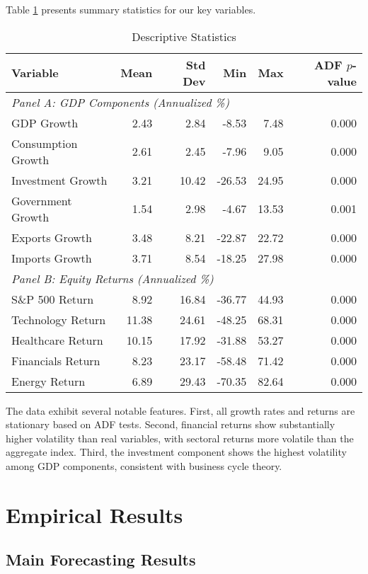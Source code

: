 \documentclass[11pt,letterpaper]{article}
\theoremstyle{plain}
\theoremstyle{definition}
\theoremstyle{remark}
\begin{document}
Table \ref{tab:descriptive} presents summary statistics for our key variables.

\begin{table}[htbp]
\centering
\caption{Descriptive Statistics}
\label{tab:descriptive}
\begin{tabular}{lrrrrr}
\toprule
Variable & Mean & Std Dev & Min & Max & ADF $p$-value \\
\midrule
\multicolumn{6}{l}{\textit{Panel A: GDP Components (Annualized \%)}} \\
GDP Growth & 2.43 & 2.84 & -8.53 & 7.48 & 0.000 \\
Consumption Growth & 2.61 & 2.45 & -7.96 & 9.05 & 0.000 \\
Investment Growth & 3.21 & 10.42 & -26.53 & 24.95 & 0.000 \\
Government Growth & 1.54 & 2.98 & -4.67 & 13.53 & 0.001 \\
Exports Growth & 3.48 & 8.21 & -22.87 & 22.72 & 0.000 \\
Imports Growth & 3.71 & 8.54 & -18.25 & 27.98 & 0.000 \\
\midrule
\multicolumn{6}{l}{\textit{Panel B: Equity Returns (Annualized \%)}} \\
S\&P 500 Return & 8.92 & 16.84 & -36.77 & 44.93 & 0.000 \\
Technology Return & 11.38 & 24.61 & -48.25 & 68.31 & 0.000 \\
Healthcare Return & 10.15 & 17.92 & -31.88 & 53.27 & 0.000 \\
Financials Return & 8.23 & 23.17 & -58.48 & 71.42 & 0.000 \\
Energy Return & 6.89 & 29.43 & -70.35 & 82.64 & 0.000 \\
\bottomrule
\end{tabular}
\end{table}

The data exhibit several notable features. First, all growth rates and returns are stationary based on ADF tests. Second, financial returns show substantially higher volatility than real variables, with sectoral returns more volatile than the aggregate index. Third, the investment component shows the highest volatility among GDP components, consistent with business cycle theory.

\section{Empirical Results}

\subsection{Main Forecasting Results}
\end{document}
